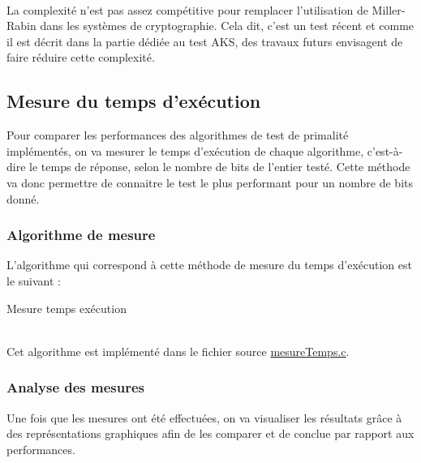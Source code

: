 			\paragraph{}La complexité n'est pas assez compétitive pour remplacer l'utilisation de Miller-Rabin dans les systèmes de cryptographie. Cela dit, c'est un test récent et comme il est décrit dans la partie dédiée au test AKS, des travaux futurs envisagent de faire réduire cette complexité.
			
	\subsection{Mesure du temps d'exécution}
		Pour comparer les performances des algorithmes de test de primalité implémentés, on va mesurer le temps d'exécution de chaque algorithme, c'est-à-dire le temps de réponse, selon le nombre de bits de l'entier testé. Cette méthode va donc permettre de connaitre le test le plus performant pour un nombre de bits donné.
		
		\subsubsection*{Algorithme de mesure}
			L'algorithme qui correspond à cette méthode de mesure du temps d'exécution est le suivant :\\
			
			\begin{algorithm}[H]
				\caption{Mesure temps exécution}\label{MEST}
			\end{algorithm}
			~\\
			Cet algorithme est implémenté dans le fichier source \href{run:../../App/src/mesures_performance/mesureTemps.c}{mesureTemps.c}.
			
		\subsubsection*{Analyse des mesures}
			Une fois que les mesures ont été effectuées, on va visualiser les résultats grâce à des représentations graphiques afin de les comparer et de conclue par rapport aux performances.
